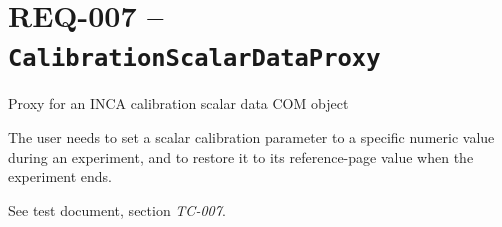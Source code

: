 \section{REQ-007 -- \texttt{CalibrationScalarDataProxy}}
\label{sec:calibrationscalardataproxy}

 Proxy for an INCA calibration scalar data COM object 

\medskip
{}
The user needs to set a scalar calibration parameter to a specific numeric value during an experiment, and to restore it to its reference-page value when the experiment ends.

\medskip
{}

\medskip
{}
See test document, section \textit{TC-007}.